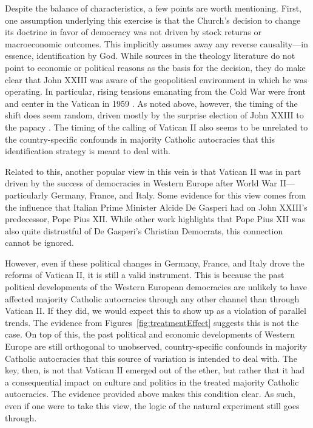 \documentclass[12pt]{article}
\numberwithin{equation}{section}
\begin{document}
Despite the balance of characteristics, a few points are worth mentioning. First, one assumption underlying this exercise is that the Church's decision to change its doctrine in favor of democracy was not driven by stock returns or macroeconomic outcomes. This implicitly assumes away any reverse causality---in essence, identification by God. While sources in the theology literature do not point to economic or political reasons as the basis for the decision,  they do make clear that John XXIII was aware of the geopolitical environment in which he was operating. In particular, rising tensions emanating from the Cold War were front and center in the Vatican in 1959 \citep{Alberigo2005}.  As noted above, however, the timing of the shift does seem random, driven mostly by the surprise election of John XXIII to the papacy \citep{Alberigo2005,Andersen2019}. The timing of the calling of Vatican II also seems to be unrelated to the country-specific confounds in majority Catholic autocracies that this identification strategy is meant to deal with. 

\label{par:acknowledge_west_europe}
Related to this, another popular view in this vein is that Vatican II was in part driven by the success of democracies in Western Europe after World War II---particularly Germany, France, and Italy. Some evidence for this view comes from the influence that Italian Prime Minister Alcide De Gasperi had on John XXIII's predecessor, Pope Pius XII. While other work highlights that Pope Pius XII was also quite distrustful of De Gasperi's Christian Democrats, this connection cannot be ignored.

However, even if these political changes in Germany, France, and Italy drove the reforms of Vatican II, it is still a valid instrument. This is because the past political developments of the Western European democracies are unlikely to have affected majority Catholic autocracies through any other channel than through Vatican II. If they did, we would expect this to show up as a violation of parallel trends. The evidence from Figures~\ref{fig:treatmentEffect} suggests this is not the case. On top of this, the past political and economic developments of Western Europe are still orthogonal to unobserved, country-specific confounds in majority Catholic autocracies that this source of variation is intended to deal with. The key, then, is not that Vatican II emerged out of the ether, but rather that it had a consequential impact on culture and politics in the treated majority Catholic autocracies. The evidence provided above makes this condition clear. As such, even if one were to take this view, the logic of the natural experiment still goes through.
\end{document}
